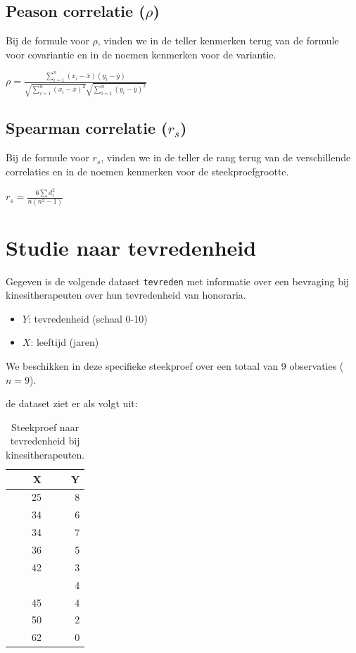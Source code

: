 \documentclass[
]{book}
\providecommand{\tightlist}{%
  \setlength{\itemsep}{0pt}\setlength{\parskip}{0pt}}
\theoremstyle{definition}
\theoremstyle{definition}
\theoremstyle{definition}
\theoremstyle{definition}
\theoremstyle{remark}
\begin{document}
\hypertarget{peason-correlatie-rho}{%
\subsection{\texorpdfstring{Peason correlatie (\(\rho\))}{Peason correlatie (\textbackslash rho)}}\label{peason-correlatie-rho}}

Bij de formule voor \(\rho\), vinden we in de teller kenmerken terug van de formule voor covariantie en in de noemen kenmerken voor de variantie.

\(\rho = \frac{\sum^n_{i=1} (x_i-\bar{x})(y_i-\bar{y})}{\sqrt{\sum^n_{i=1}(x_i-\bar{x})^2} \sqrt{\sum^n_{i=1}(y_i-\bar{y})^2}}\)

\hypertarget{spearman-correlatie-r_s}{%
\subsection{\texorpdfstring{Spearman correlatie (\(r_s\))}{Spearman correlatie (r\_s)}}\label{spearman-correlatie-r_s}}

Bij de formule voor \(r_s\), vinden we in de teller de rang terug van de verschillende correlaties en in de noemen kenmerken voor de steekproefgrootte.

\(r_s = \frac{6 \sum d^2_i}{n(n^2-1)}\)

\hypertarget{studie-naar-tevredenheid}{%
\section*{Studie naar tevredenheid}\label{studie-naar-tevredenheid}}


Gegeven is de volgende dataset \texttt{tevreden} met informatie over een bevraging bij kinesitherapeuten over hun tevredenheid van honoraria.

\begin{itemize}
\tightlist
\item
  \(Y\): tevredenheid (schaal 0-10)
\item
  \(X\): leeftijd (jaren)
\end{itemize}

We beschikken in deze specifieke steekproef over een totaal van 9 observaties (\(n = 9\)).

de dataset ziet er als volgt uit:

\begin{table}

\caption{\label{tab:tevereden}Steekproef naar tevredenheid bij kinesitherapeuten.}
\centering
\begin{tabular}[t]{rr}
\toprule
X & Y\\
\midrule
25 & 8\\
34 & 6\\
34 & 7\\
36 & 5\\
42 & 3\\
\addlinespace
44 & 4\\
45 & 4\\
50 & 2\\
62 & 0\\
\bottomrule
\end{tabular}
\end{table}
\end{document}
